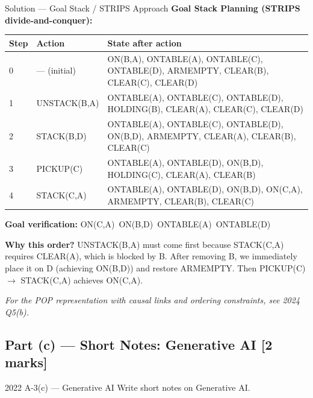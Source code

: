 \documentclass[12pt,a4paper]{article}
\begin{document}
\begin{solbox}{Solution --- Goal Stack / STRIPS Approach}
\textbf{Goal Stack Planning (STRIPS divide-and-conquer):}

\medskip
\begin{tabular}{@{}llp{7cm}@{}}
\toprule
\textbf{Step} & \textbf{Action} & \textbf{State after action} \\
\midrule
0 & --- (initial) &
  ON(B,A), ONTABLE(A), ONTABLE(C), ONTABLE(D),
  ARMEMPTY, CLEAR(B), CLEAR(C), CLEAR(D) \\
1 & UNSTACK(B,A) &
  ONTABLE(A), ONTABLE(C), ONTABLE(D),
  HOLDING(B), CLEAR(A), CLEAR(C), CLEAR(D) \\
2 & STACK(B,D) &
  ONTABLE(A), ONTABLE(C), ONTABLE(D), ON(B,D),
  ARMEMPTY, CLEAR(A), CLEAR(B), CLEAR(C) \\
3 & PICKUP(C) &
  ONTABLE(A), ONTABLE(D), ON(B,D),
  HOLDING(C), CLEAR(A), CLEAR(B) \\
4 & STACK(C,A) &
  ONTABLE(A), ONTABLE(D), ON(B,D), ON(C,A),
  ARMEMPTY, CLEAR(B), CLEAR(C) \\
\bottomrule
\end{tabular}

\medskip
\textbf{Goal verification:}
ON(C,A)~\checkmark\quad ON(B,D)~\checkmark\quad ONTABLE(A)~\checkmark\quad ONTABLE(D)~\checkmark

\medskip
\textbf{Why this order?}
UNSTACK(B,A) must come first because STACK(C,A) requires CLEAR(A),
which is blocked by B. After removing B, we immediately place it on D (achieving
ON(B,D)) and restore ARMEMPTY. Then PICKUP(C) $\rightarrow$ STACK(C,A) achieves ON(C,A).

\medskip
\emph{For the POP representation with causal links and ordering constraints, see 2024 Q5(b).}
\end{solbox}

\subsection{Part (c) --- Short Notes: Generative AI [2 marks]}

\begin{qbox}{2022 A-3(c) --- Generative AI}
Write short notes on Generative AI.
\end{qbox}
\end{document}
